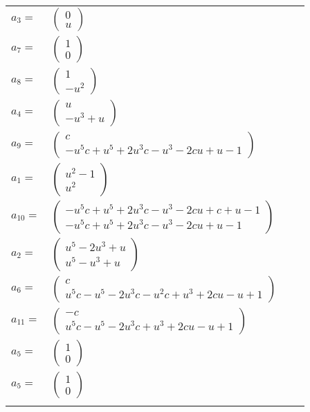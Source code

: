 \documentclass[1p]{elsarticle_modified}
\theoremstyle{definition}
\begin{document}
\begin{tabular}{m{7pt} m{180pt} m{7pt} m{180pt} }
\flushright $a_{3}=$&$\begin{pmatrix}0\\u\end{pmatrix}$ \\
\flushright $a_{7}=$&$\begin{pmatrix}1\\0\end{pmatrix}$ \\
\flushright $a_{8}=$&$\begin{pmatrix}1\\- u^2\end{pmatrix}$ \\
\flushright $a_{4}=$&$\begin{pmatrix}u\\- u^3+u\end{pmatrix}$ \\
\flushright $a_{9}=$&$\begin{pmatrix}c\\- u^5 c+u^5+2 u^3 c- u^3-2 c u+u-1\end{pmatrix}$ \\
\flushright $a_{1}=$&$\begin{pmatrix}u^2-1\\u^2\end{pmatrix}$ \\
\flushright $a_{10}=$&$\begin{pmatrix}- u^5 c+u^5+2 u^3 c- u^3-2 c u+c+u-1\\- u^5 c+u^5+2 u^3 c- u^3-2 c u+u-1\end{pmatrix}$ \\
\flushright $a_{2}=$&$\begin{pmatrix}u^5-2 u^3+u\\u^5- u^3+u\end{pmatrix}$ \\
\flushright $a_{6}=$&$\begin{pmatrix}c\\u^5 c- u^5-2 u^3 c- u^2 c+u^3+2 c u- u+1\end{pmatrix}$ \\
\flushright $a_{11}=$&$\begin{pmatrix}- c\\u^5 c- u^5-2 u^3 c+u^3+2 c u- u+1\end{pmatrix}$ \\
\flushright $a_{5}=$&$\begin{pmatrix}1\\0\end{pmatrix}$\\ \flushright $a_{5}=$&$\begin{pmatrix}1\\0\end{pmatrix}$\\&\end{tabular}
\end{document}
